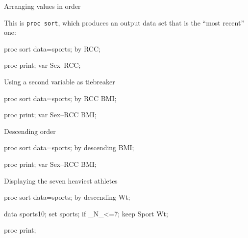 \documentclass[unknownkeysallowed]{beamer}\usepackage[]{graphicx}\usepackage[]{color}
\begin{document}
\begin{frame}[fragile]{Arranging values in order}
  
  This is \texttt{proc sort}, which produces an output data set that
  is the ``most recent'' one:
  
  \begin{Sascode}[store=tj]
proc sort data=sports;
  by RCC;
  
proc print;  
  var Sex--RCC;
  \end{Sascode}
  
  
\end{frame}

\begin{frame}[fragile]{Using a second variable as tiebreaker}
  
  
  \begin{Sascode}[store=tk]
proc sort data=sports;
  by RCC BMI;
  
proc print;  
  var Sex--RCC BMI;
  \end{Sascode}
  
  
\end{frame}

\begin{frame}[fragile]{Descending order}
  
  
  \begin{Sascode}[store=tl]
proc sort data=sports;
  by descending BMI;
  
proc print;  
  var Sex--RCC BMI;
  \end{Sascode}
  
  
\end{frame}

\begin{frame}[fragile]{Displaying the seven heaviest athletes}
  
  \begin{Sascode}[store=tm]
proc sort data=sports;
  by descending Wt;
  
data sports10;
  set sports;
  if _N_<=7;
  keep Sport Wt;
  
proc print;
  \end{Sascode}
  
  
\end{frame}
\end{document}

